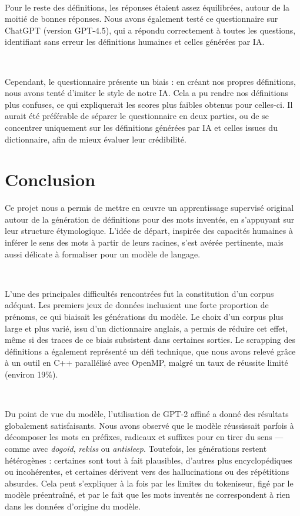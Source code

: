 \documentclass[french]{template}
\begin{document}
\

Pour le reste des définitions, les réponses étaient assez équilibrées, autour de la moitié de bonnes réponses. Nous avons également testé ce questionnaire sur ChatGPT (version GPT-4.5), qui a répondu correctement à toutes les questions, identifiant sans erreur les définitions humaines et celles générées par IA.

\

Cependant, le questionnaire présente un biais : en créant nos propres définitions, nous avons tenté d'imiter le style de notre IA. Cela a pu rendre nos définitions plus confuses, ce qui expliquerait les scores plus faibles obtenus pour celles-ci. Il aurait été préférable de séparer le questionnaire en deux parties, ou de se concentrer uniquement sur les définitions générées par IA et celles issues du dictionnaire, afin de mieux évaluer leur crédibilité.

\section{Conclusion}

Ce projet nous a permis de mettre en œuvre un apprentissage supervisé original autour de la génération de définitions pour des mots inventés, en s'appuyant sur leur structure étymologique. L'idée de départ, inspirée des capacités humaines à inférer le sens des mots à partir de leurs racines, s'est avérée pertinente, mais aussi délicate à formaliser pour un modèle de langage.

\

L’une des principales difficultés rencontrées fut la constitution d’un corpus adéquat. Les premiers jeux de données incluaient une forte proportion de prénoms, ce qui biaisait les générations du modèle. Le choix d’un corpus plus large et plus varié, issu d’un dictionnaire anglais, a permis de réduire cet effet, même si des traces de ce biais subsistent dans certaines sorties. Le scrapping des définitions a également représenté un défi technique, que nous avons relevé grâce à un outil en C++ parallélisé avec OpenMP, malgré un taux de réussite limité (environ 19\%).

\

Du point de vue du modèle, l’utilisation de GPT-2 affiné a donné des résultats globalement satisfaisants. Nous avons observé que le modèle réussissait parfois à décomposer les mots en préfixes, radicaux et suffixes pour en tirer du sens — comme avec \textit{dogoid}, \textit{rekiss} ou \textit{antisleep}. Toutefois, les générations restent hétérogènes : certaines sont tout à fait plausibles, d’autres plus encyclopédiques ou incohérentes, et certaines dérivent vers des hallucinations ou des répétitions absurdes. Cela peut s'expliquer à la fois par les limites du tokeniseur, figé par le modèle préentraîné, et par le fait que les mots inventés ne correspondent à rien dans les données d'origine du modèle.
\end{document}
